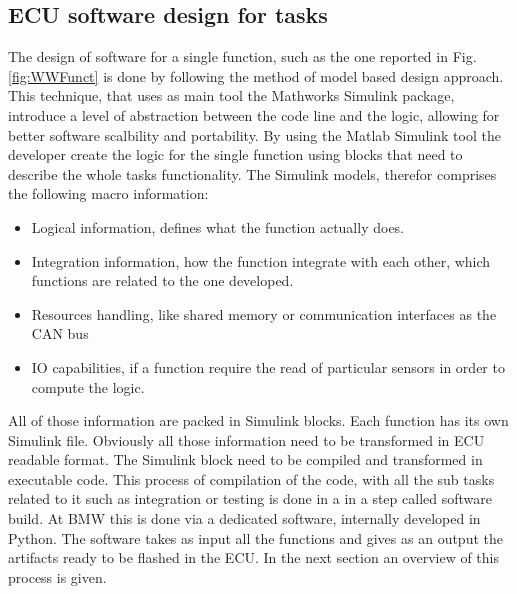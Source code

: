 \documentclass[../main.tex]{subfiles}
\begin{document}
\subsection{ECU software design for tasks}
The design of software for a single function, such as the one reported in Fig.\ref{fig:WWFunct} is done by following the method of model based design approach. This technique, that uses as main tool the Mathworks Simulink package, introduce a level of abstraction between the code line and the logic, allowing for better software scalbility and portability. By using the Matlab Simulink tool the developer create the logic for the single function using blocks that need to describe the whole tasks functionality. The Simulink models, therefor comprises the following macro information:
\begin{itemize}
    \item Logical information, defines what the function actually does. 
    \item Integration information, how the function integrate with each other, which functions are related to the one developed. 
    \item Resources handling, like shared memory or communication interfaces as  the CAN bus
    \item IO capabilities, if a function require the read of particular sensors in order to compute the logic. 
\end{itemize}
All of those information are packed in Simulink blocks. Each function has its own Simulink file. Obviously all those information need to be transformed in ECU readable format. The Simulink block need to be compiled and transformed in executable code. This process of compilation of the code, with all the sub tasks related to it such as integration or testing is done in a in a step called software build. 
At BMW this is done via a dedicated software, internally developed in Python. The software takes as input all the functions and gives as an output the artifacts ready to be flashed in the ECU. In the next section an overview of this process is given.
\end{document}
